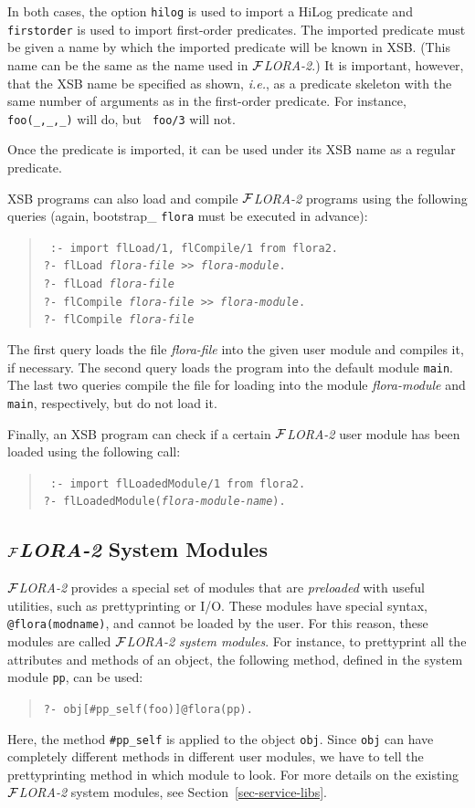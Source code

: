\documentclass[11pt]{article}
\newcommand{\FLORA}{{\mbox{${\cal F}${\small\it LORA}\rm\emph{-2}}}\xspace}
\begin{document}
In both cases, the option {\tt hilog} is used to import a HiLog predicate
and {\tt firstorder} is used to import first-order predicates. The imported
predicate must be given a name by which the imported predicate will be
known in XSB.  (This name can be the same as the name used in \FLORA.)  It
is important, however, that the XSB name be specified as shown, {\it i.e.},
as a predicate skeleton with the same number of arguments as in the
first-order predicate. For instance, {\tt foo(\_,\_,\_)} will do, but {\tt
  foo/3} will not.

Once the predicate is imported, it can be used under its XSB name as a
regular predicate.

XSB programs can also load and compile \FLORA programs using the following
queries (again, bootstrap\_ {\tt flora} must be executed in advance): 
\begin{quote}
 \tt
 :- import flLoad/1, flCompile/1 from flora2.\\
 ?- flLoad  {\it flora-file} >> {\it flora-module}.\\
 ?- flLoad  {\it flora-file}\\
 ?- flCompile {\it flora-file} >> {\it flora-module}.\\
 ?- flCompile  {\it flora-file}
\end{quote}
The first query loads the file {\it flora-file\/} into the given user
module and compiles it, if necessary. The second query loads the program
into the default module {\tt main}. The last two queries compile the file
for loading into the module {\it flora-module} and {\tt main},
respectively, but do not load it.

Finally, an XSB program can check if a certain \FLORA user module has been
loaded using the following call:
\begin{quote}
 \tt
 :- import flLoadedModule/1 from flora2.\\
 ?- flLoadedModule({\it flora-module-name}).
\end{quote}

\subsection{\FLORA System Modules}\label{sec-flora-system-modules}

\FLORA provides a special set of modules that are \emph{preloaded} with
useful utilities, such as prettyprinting or I/O. These modules have special
syntax, {\tt @flora(modname)}, and cannot be loaded by the user. For this
reason, these modules are called \emph{\FLORA system modules}.  For
instance, to prettyprint all the attributes and methods of an object, the
following method, defined in the system module {\tt pp}, can be used:
\begin{quote}
 \tt   ?- obj[\#pp\_self(foo)]@flora(pp).
\end{quote}
Here, the method {\tt \#pp\_self} is applied to the object {\tt obj}.
Since {\tt obj} can have completely different methods in different user
modules, we have to tell the prettyprinting method in which module to look.
For more details on the existing \FLORA system modules, see
Section~\ref{sec-service-libs}.
\end{document}
